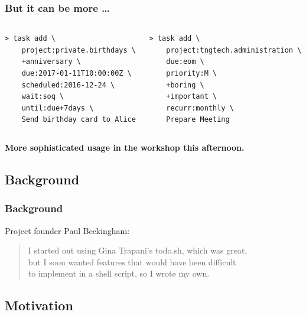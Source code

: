 \documentclass[t,handout,aspectratio=169]{beamer}
\begin{document}
\begin{frame}[fragile]\frametitle{But it can be more \ldots}
    \vfill
    \begin{columns}[t]

        \begin{column}{0.45\textwidth}
            \begin{lstlisting}
> task add \
    project:private.birthdays \
    +anniversary \
    due:2017-01-11T10:00:00Z \
    scheduled:2016-12-24 \
    wait:soq \
    until:due+7days \
    Send birthday card to Alice\end{lstlisting} \pause
        \end{column}

        \begin{column}{0.45\textwidth}
            \begin{lstlisting}
> task add \
    project:tngtech.administration \
    due:eom \
    priority:M \
    +boring \
    +important \
    recurr:monthly \
    Prepare Meeting\end{lstlisting} \pause
        \end{column}

    \end{columns}

    \begin{center}
        \textbf{More sophisticated usage in the workshop this afternoon.}
    \end{center}
\end{frame}

\subsection{Background}

\begin{frame}[fragile]\frametitle{Background}
    \vfill
    Project founder Paul Beckingham:

    \begin{quote}
        I started out using Gina Trapani's todo.sh, which was great, \\
        but I soon wanted features that would have been difficult \\
        to implement in a shell script, so I wrote my own.
    \end{quote}
\end{frame}

\subsection{Motivation}
\end{document}
